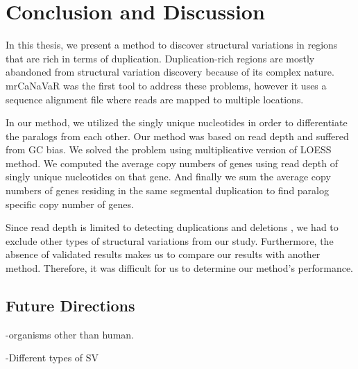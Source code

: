 \chapter{Conclusion and Discussion}
In this thesis, we present a method to discover structural variations in regions that are rich in terms of duplication. Duplication-rich regions are mostly abandoned from 
structural variation discovery because of its complex nature. mrCaNaVaR was the first tool to address these problems, however it uses a sequence alignment file where reads are mapped to multiple locations. 

In our method, we utilized the singly unique nucleotides in order to differentiate the paralogs from each other. Our method was based on read depth and suffered from GC bias. We solved the problem using multiplicative version of LOESS method. We computed the average copy numbers of genes using read depth of singly unique nucleotides on that gene. And finally we sum the average copy numbers of genes residing in the same segmental duplication to find paralog specific copy number of genes.

Since read depth is limited to detecting duplications and deletions \cite{alkan2011genome}, we had to exclude other types of structural variations from our study. Furthermore, the absence of validated results makes us to compare our results with another method. Therefore, it was difficult for us to determine our method's performance. 

\section{Future Directions}

-organisms other than human.

-Different types of SV